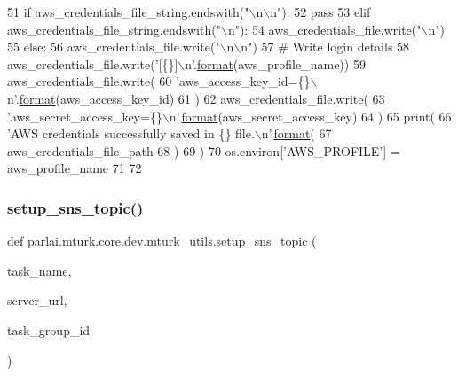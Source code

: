 \begin{DoxyCode}
51                 \textcolor{keywordflow}{if} aws\_credentials\_file\_string.endswith(\textcolor{stringliteral}{"\(\backslash\)n\(\backslash\)n"}):
52                     \textcolor{keywordflow}{pass}
53                 \textcolor{keywordflow}{elif} aws\_credentials\_file\_string.endswith(\textcolor{stringliteral}{"\(\backslash\)n"}):
54                     aws\_credentials\_file.write(\textcolor{stringliteral}{"\(\backslash\)n"})
55                 \textcolor{keywordflow}{else}:
56                     aws\_credentials\_file.write(\textcolor{stringliteral}{"\(\backslash\)n\(\backslash\)n"})
57             \textcolor{comment}{# Write login details}
58             aws\_credentials\_file.write(\textcolor{stringliteral}{'[\{\}]\(\backslash\)n'}.\hyperlink{namespaceparlai_1_1chat__service_1_1services_1_1messenger_1_1shared__utils_a32e2e2022b824fbaf80c747160b52a76}{format}(aws\_profile\_name))
59             aws\_credentials\_file.write(
60                 \textcolor{stringliteral}{'aws\_access\_key\_id=\{\}\(\backslash\)n'}.\hyperlink{namespaceparlai_1_1chat__service_1_1services_1_1messenger_1_1shared__utils_a32e2e2022b824fbaf80c747160b52a76}{format}(aws\_access\_key\_id)
61             )
62             aws\_credentials\_file.write(
63                 \textcolor{stringliteral}{'aws\_secret\_access\_key=\{\}\(\backslash\)n'}.\hyperlink{namespaceparlai_1_1chat__service_1_1services_1_1messenger_1_1shared__utils_a32e2e2022b824fbaf80c747160b52a76}{format}(aws\_secret\_access\_key)
64             )
65         print(
66             \textcolor{stringliteral}{'AWS credentials successfully saved in \{\} file.\(\backslash\)n'}.\hyperlink{namespaceparlai_1_1chat__service_1_1services_1_1messenger_1_1shared__utils_a32e2e2022b824fbaf80c747160b52a76}{format}(
67                 aws\_credentials\_file\_path
68             )
69         )
70     os.environ[\textcolor{stringliteral}{'AWS\_PROFILE'}] = aws\_profile\_name
71 
72 
\end{DoxyCode}
\mbox{\label{namespaceparlai_1_1mturk_1_1core_1_1dev_1_1mturk__utils_a01315ef04ead23e4c1a84c027dcccf3f}} 
\subsubsection{\texorpdfstring{setup\+\_\+sns\+\_\+topic()}{setup\_sns\_topic()}}
{\footnotesize\ttfamily def parlai.\+mturk.\+core.\+dev.\+mturk\+\_\+utils.\+setup\+\_\+sns\+\_\+topic (\begin{DoxyParamCaption}\item[{}]{task\+\_\+name,  }\item[{}]{server\+\_\+url,  }\item[{}]{task\+\_\+group\+\_\+id }\end{DoxyParamCaption})}



